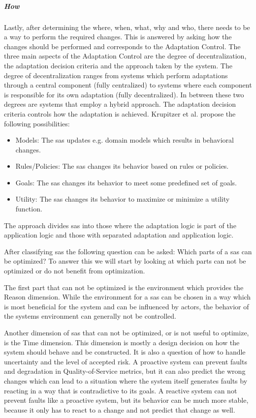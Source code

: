 \subparagraph*{How}
Lastly, after determining the where, when, what, why and who, there needs to be a way
to perform the required changes. This is answered by asking how the changes should be performed
and corresponds to the Adaptation Control.
The three main aspects of the Adaptation Control are the degree of decentralization, the adaptation decision criteria
and the approach taken by the system.
The degree of decentralization ranges from systems which perform adaptations through a central component (fully centralized)
to systems where each component is responsible for its own adaptation (fully decentralized).
In between these two degrees are systems that employ a hybrid approach.
The adaptation decision criteria controls how the adaptation is achieved.
Krupitzer et al. propose the following possibilities:
\begin{itemize}[nosep]
    \item Models: The \acrshort{sas} updates e.g. domain models which results in behavioral changes.
    \item Rules/Policies: The \acrshort{sas} changes its behavior based on rules or policies.
    \item Goals: The \acrshort{sas} changes its behavior to meet some predefined set of goals.
    \item Utility: The \acrshort{sas} changes its behavior to maximize or minimize a utility function.
\end{itemize}
The approach divides \acrshort{sas} into those where the adaptation logic is part of the application logic
and those with separated adaptation and application logic.

\noindent After classifying \acrshort{sas} the following question can be asked: Which parts of a \acrshort{sas} can be optimized?
To answer this we will start by looking at which parts can not be optimized or do not benefit from optimization.

\noindent The first part that can not be optimized is the environment which provides the Reason dimension.
While the environment for a \acrshort{sas} can be chosen in a way which is most beneficial for the system
and can be influenced by actors,
the behavior of the systems environment can generally not be controlled.

\noindent Another dimension of \acrshort{sas} that can not be optimized, or is not useful to optimize,
is the Time dimension. This dimension is mostly a design decision on how the system should behave and be constructed.
It is also a question of how to handle uncertainty and the level of accepted risk.
A proactive system can prevent faults and degradation in Quality-of-Service metrics,
but it can also predict the wrong changes which can lead to a situation where the system itself generates faults by
reacting in a way that is contradictive to its goals.
A reactive system can not prevent faults like a proactive system,
but its behavior can be much more stable, because it only has to react to a change and not predict that change as well.

